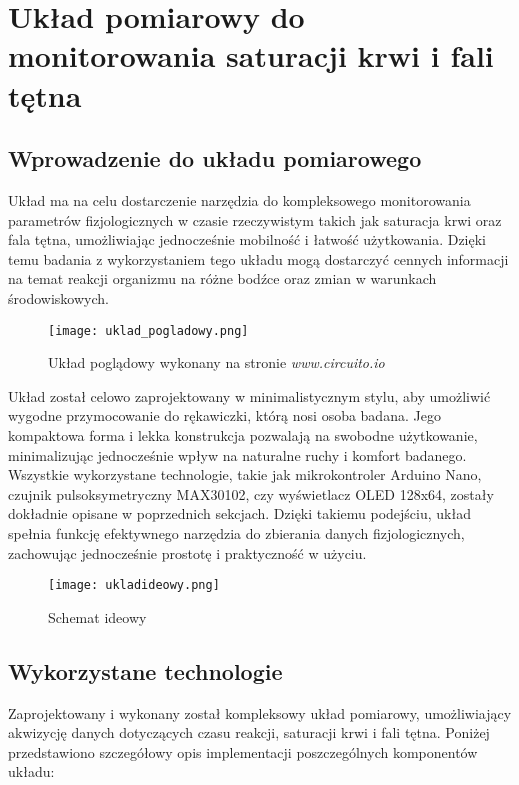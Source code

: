 \chapter{Układ pomiarowy do monitorowania saturacji krwi i fali tętna}
\section{Wprowadzenie do układu pomiarowego}
Układ ma na celu dostarczenie narzędzia do kompleksowego monitorowania parametrów fizjologicznych w czasie rzeczywistym takich jak saturacja krwi oraz fala tętna, umożliwiając jednocześnie mobilność i łatwość użytkowania. Dzięki temu badania z wykorzystaniem tego układu mogą dostarczyć cennych informacji na temat reakcji organizmu na różne bodźce oraz zmian w warunkach środowiskowych.
\begin{figure}[!htb]
    \centering
    \texttt{[image: uklad\_pogladowy.png]}
    \caption{Układ poglądowy wykonany na stronie \textit{www.circuito.io}}
\end{figure}

Układ został celowo zaprojektowany w minimalistycznym stylu, aby umożliwić wygodne przymocowanie do rękawiczki, którą nosi osoba badana. Jego kompaktowa forma i lekka konstrukcja pozwalają na swobodne użytkowanie, minimalizując jednocześnie wpływ na naturalne ruchy i komfort badanego. Wszystkie wykorzystane technologie, takie jak mikrokontroler Arduino Nano, czujnik pulsoksymetryczny MAX30102, czy wyświetlacz OLED 128x64, zostały dokładnie opisane w poprzednich sekcjach. Dzięki takiemu podejściu, układ spełnia funkcję efektywnego narzędzia do zbierania danych fizjologicznych, zachowując jednocześnie prostotę i praktyczność w użyciu.
\begin{figure}[!htb]
  \centering
  \texttt{[image: ukladideowy.png]}
  \caption{Schemat ideowy}
\end{figure}
\section{Wykorzystane technologie}
Zaprojektowany i wykonany został kompleksowy układ pomiarowy, umożliwiający akwizycję danych dotyczących czasu reakcji, saturacji krwi i fali tętna. Poniżej przedstawiono szczegółowy opis implementacji poszczególnych komponentów układu:
